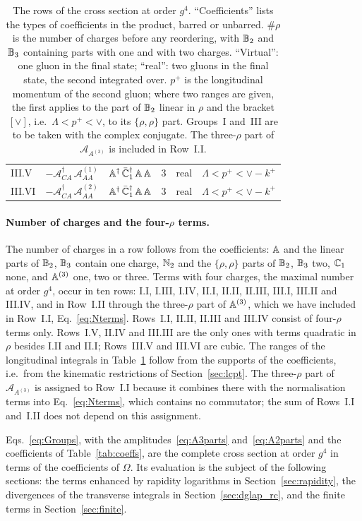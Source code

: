 \begin{table}[t]
\begin{tabular}{@{}l l l c l l@{}}
III.V & $-\mathcal A^{\dagger}_{CA}\,\mathcal A^{(1)}_{AA}$ & $\mathbb{A}^\dagger\,\bar{\mathbb{C}}_1^\dagger\,\mathbb{A}\,\mathbb{A}$ & 3 & real & $\Lambda<p^+<\vee-k^+$\\
III.VI & $-\mathcal A^{\dagger}_{CA}\,\mathcal A^{(2)}_{AA}$ & $\mathbb{A}^\dagger\,\bar{\mathbb{C}}_1^\dagger\,\mathbb{A}\,\mathbb{A}$ & 3 & real & $\Lambda<p^+<\vee-k^+$\\
\bottomrule
\end{tabular}
\caption{The rows of the cross section at order $g^4$. ``Coefficients'' lists the types of coefficients in the product, barred or unbarred. $\#\rho$ is the number of charges before any reordering, with $\mathbb{B}_2$ and $\mathbb{B}_3$ containing parts with one and with two charges. ``Virtual'': one gluon in the final state; ``real'': two gluons in the final state, the second integrated over. $p^+$ is the longitudinal momentum of the second gluon; where two ranges are given, the first applies to the part of $\mathbb{B}_2$ linear in $\rho$ and the bracket $[\vee]$, i.e.\ $\Lambda<p^+<\vee$, to its $\{\rho,\rho\}$ part. Groups~I and~III are to be taken with the complex conjugate. The three-$\rho$ part of $\mathcal A_{A^{(3)}}$ is included in Row~I.I.}
\label{tab:rows}
\end{table}

\paragraph{Number of charges and the four-$\rho$ terms.} The number of charges in a row follows from the coefficients: $\mathbb{A}$ and the linear parts of $\mathbb{B}_2$, $\mathbb{B}_3$ contain one charge, $\mathbb{N}_2$ and the $\{\rho,\rho\}$ parts of $\mathbb{B}_2$, $\mathbb{B}_3$ two, $\mathbb{C}_1$ none, and $\mathbb{A}^{(3)}$ one, two or three. Terms with four charges, the maximal number at order $g^4$, occur in ten rows: I.I, I.III, I.IV, II.I, II.II, II.III, III.I, III.II and III.IV, and in Row~I.II through the three-$\rho$ part of $\mathbb{A}^{(3)}$, which we have included in Row~I.I, Eq.~\eqref{eq:Nterms}. Rows~I.I, II.II, II.III and III.IV consist of four-$\rho$ terms only. Rows~I.V, II.IV and III.III are the only ones with terms quadratic in $\rho$ besides I.II and II.I; Rows~III.V and III.VI are cubic. The ranges of the longitudinal integrals in Table~\ref{tab:rows} follow from the supports of the coefficients, i.e.\ from the kinematic restrictions of Section~\ref{sec:lcpt}. The three-$\rho$ part of $\mathcal A_{A^{(3)}}$ is assigned to Row~I.I because it combines there with the normalisation terms into Eq.~\eqref{eq:Nterms}, which contains no commutator; the sum of Rows~I.I and~I.II does not depend on this assignment.

Eqs.~\eqref{eq:Groups}, with the amplitudes~\eqref{eq:A3parts} and~\eqref{eq:A2parts} and the coefficients of Table~\ref{tab:coeffs}, are the complete cross section at order $g^4$ in terms of the coefficients of $\Omega$. Its evaluation is the subject of the following sections: the terms enhanced by rapidity logarithms in Section~\ref{sec:rapidity}, the divergences of the transverse integrals in Section~\ref{sec:dglap_rc}, and the finite terms in Section~\ref{sec:finite}.
